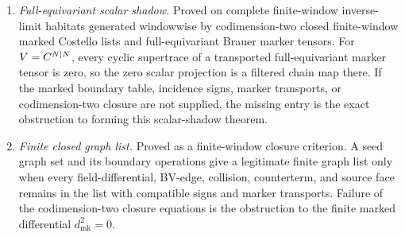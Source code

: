 \begin{stmt}
\begin{enumerate}[label=(\arabic*)]
    \item \emph{Full-equivariant scalar shadow.}  Proved on complete
    finite-window inverse-limit habitats generated windowwise by
    codimension-two closed finite-window marked Costello lists and
    full-equivariant Brauer marker tensors.  For \(V=C^{N|N}\), every
    cyclic supertrace of a transported full-equivariant marker tensor is
    zero, so the zero scalar projection is a filtered chain map there.
    If the marked boundary table, incidence signs, marker transports, or
    codimension-two closure are not supplied, the missing entry is the
    exact obstruction to forming this scalar-shadow theorem.

    \item \emph{Finite closed graph list.}  Proved as a finite-window
    closure criterion.  A seed graph set and its boundary operations give
    a legitimate finite graph list only when every field-differential,
    BV-edge, collision, counterterm, and source face remains in the list
    with compatible signs and marker transports.  Failure of the
    codimension-two closure equations is the obstruction to the finite
    marked differential \(d_{\mathrm{mk}}^2=0\).


\end{enumerate}
\end{stmt}
